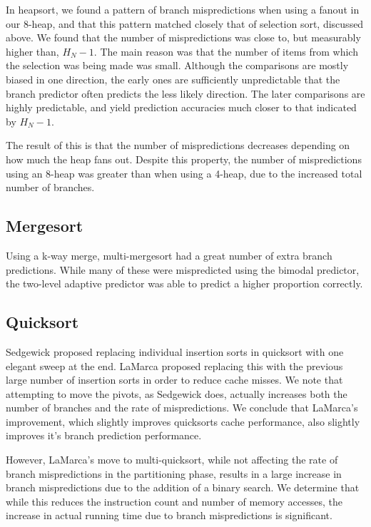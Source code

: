 In heapsort, we found a pattern of branch mispredictions when using a fanout in
our 8-heap, and that this pattern matched closely that of selection sort,
discussed above. We found that the number of mispredictions was close to, but
measurably higher than, $H_N-1$. The main reason was that the number of items
from which the selection was being made was small. Although the comparisons are
mostly biased in one direction, the early ones are sufficiently unpredictable
that the branch predictor often predicts the less likely direction. The later
comparisons are highly predictable, and yield prediction accuracies much closer
to that indicated by $H_N-1$.

The result of this is that the number of mispredictions decreases depending on
how much the heap fans out. Despite this property, the number of mispredictions
using an 8-heap was greater than when using a 4-heap, due to the increased total
number of branches.


\subsection{Mergesort}

Using a k-way merge, multi-mergesort had a great number of extra branch
predictions. While many of these were mispredicted using the bimodal predictor,
the two-level adaptive predictor was able to predict a higher proportion
correctly.


\subsection{Quicksort}

Sedgewick proposed replacing individual insertion sorts in quicksort with one
elegant sweep at the end. LaMarca proposed replacing this with the previous
large number of insertion sorts in order to reduce cache misses. We note that
attempting to move the pivots, as Sedgewick does, actually increases both the
number of branches and the rate of mispredictions. We conclude that LaMarca's
improvement, which slightly improves quicksorts cache performance, also slightly
improves it's branch prediction performance.

However, LaMarca's move to multi-quicksort, while not affecting the rate of
branch mispredictions in the partitioning phase, results in a large increase in
branch mispredictions due to the addition of a binary search. We determine that
while this reduces the instruction count and number of memory accesses, the
increase in actual running time due to branch mispredictions is significant.

